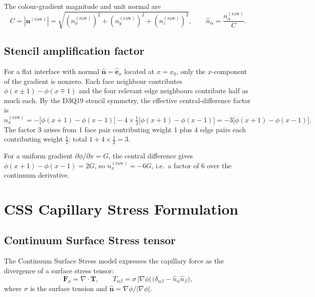 \documentclass[11pt,a4paper]{article}
\newcommand{\vect}[1]{\bm{#1}}
\newcommand{\tens}[1]{\bm{#1}}
\newcommand{\hatx}{\hat{\vect{e}}_x}
\begin{document}
The colour-gradient magnitude and unit normal are
\begin{equation}
  C = |\vect{n}^{(\text{raw})}| = \sqrt{(n_x^{(\text{raw})})^2 +
  (n_y^{(\text{raw})})^2 + (n_z^{(\text{raw})})^2},
  \qquad
  \hat{n}_\alpha = \frac{n_\alpha^{(\text{raw})}}{C}.
  \label{eq:Cdef}
\end{equation}

\subsection{Stencil amplification factor}
\label{sec:stencilfactor}

For a flat interface with normal $\hat{\vect{n}} = \hatx$ located at
$x=x_0$, only the $x$-component of the gradient is nonzero.  Each face
neighbour contributes $\phi(x\pm 1) - \phi(x\mp 1)$ and the four
relevant edge neighbours contribute half as much each.  By the
D3Q19 stencil symmetry, the effective central-difference factor is
\begin{equation}
  n_x^{(\text{raw})} = -\bigl[\phi(x+1)-\phi(x-1)\bigr]
  - 4\times\tfrac{1}{2}\bigl[\phi(x+1)-\phi(x-1)\bigr]
  = -3\bigl[\phi(x+1)-\phi(x-1)\bigr].
  \label{eq:nxflat}
\end{equation}
The factor $3$ arises from 1 face pair contributing weight 1 plus
4 edge pairs each contributing weight $\tfrac{1}{2}$: total $1+4\times\frac{1}{2}=3$.

For a uniform gradient $\partial\phi/\partial x = G$, the central
difference gives $\phi(x+1)-\phi(x-1) = 2G$, so $n_x^{(\text{raw})} =
-6G$, i.e.\ a factor of $6$ over the continuum derivative.

\section{CSS Capillary Stress Formulation}
\label{sec:css}

\subsection{Continuum Surface Stress tensor}

The Continuum Surface Stress model expresses the capillary force as
the divergence of a surface stress tensor:
\begin{equation}
  \vect{F}_\sigma = \nabla\!\cdot\!\tens{T}, \qquad
  T_{\alpha\beta} = \sigma\,|\nabla\phi|\,
  \bigl(\delta_{\alpha\beta} - \hat{n}_\alpha\hat{n}_\beta\bigr),
  \label{eq:CSStensor}
\end{equation}
where $\sigma$ is the surface tension and $\hat{\vect{n}} = \nabla\phi / |\nabla\phi|$.
\end{document}
